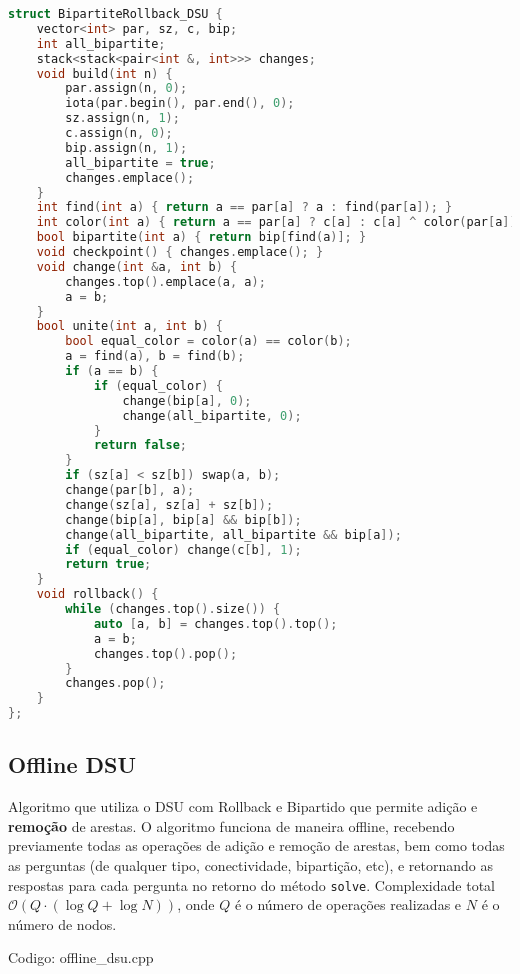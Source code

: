 \documentclass[10pt, a4paper, oneside]{book}
\begin{document}
\begin{lstlisting}[language=C++]
struct BipartiteRollback_DSU {
    vector<int> par, sz, c, bip;
    int all_bipartite;
    stack<stack<pair<int &, int>>> changes;
    void build(int n) {
        par.assign(n, 0);
        iota(par.begin(), par.end(), 0);
        sz.assign(n, 1);
        c.assign(n, 0);
        bip.assign(n, 1);
        all_bipartite = true;
        changes.emplace();
    }
    int find(int a) { return a == par[a] ? a : find(par[a]); }
    int color(int a) { return a == par[a] ? c[a] : c[a] ^ color(par[a]); }
    bool bipartite(int a) { return bip[find(a)]; }
    void checkpoint() { changes.emplace(); }
    void change(int &a, int b) {
        changes.top().emplace(a, a);
        a = b;
    }
    bool unite(int a, int b) {
        bool equal_color = color(a) == color(b);
        a = find(a), b = find(b);
        if (a == b) {
            if (equal_color) {
                change(bip[a], 0);
                change(all_bipartite, 0);
            }
            return false;
        }
        if (sz[a] < sz[b]) swap(a, b);
        change(par[b], a);
        change(sz[a], sz[a] + sz[b]);
        change(bip[a], bip[a] && bip[b]);
        change(all_bipartite, all_bipartite && bip[a]);
        if (equal_color) change(c[b], 1);
        return true;
    }
    void rollback() {
        while (changes.top().size()) {
            auto [a, b] = changes.top().top();
            a = b;
            changes.top().pop();
        }
        changes.pop();
    }
};\end{lstlisting}
\hfill

\subsection{Offline DSU}


Algoritmo que utiliza o DSU com Rollback e Bipartido que permite adição e \textbf{remoção} de arestas. O algoritmo funciona de maneira offline, recebendo previamente todas as operações de adição e remoção de arestas, bem como todas as perguntas (de qualquer tipo, conectividade, bipartição, etc), e retornando as respostas para cada pergunta no retorno do método \texttt{solve}. Complexidade total $\mathcal{O}(Q \cdot (\log Q + \log N))$, onde $Q$ é o número de operações realizadas e $N$ é o número de nodos.

\hfill

Codigo: offline\_dsu.cpp
\end{document}
